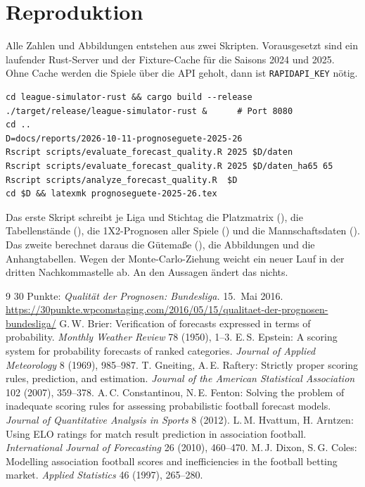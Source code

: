 \documentclass[11pt,a4paper,parskip=half,numbers=noenddot]{scrartcl}
\newcommand{\code}[1]{\texttt{#1}}
\begin{document}
\clearpage
\section{Reproduktion}\label{anh:repro}

Alle Zahlen und Abbildungen entstehen aus zwei Skripten. Vorausgesetzt sind
ein laufender Rust-Server und der Fixture-Cache 
für die Saisons 2024 und 2025. Ohne Cache werden die Spiele über die API
geholt, dann ist \code{RAPIDAPI\_KEY} nötig.
\begin{verbatim}
cd league-simulator-rust && cargo build --release
./target/release/league-simulator-rust &      # Port 8080
cd ..
D=docs/reports/2026-10-11-prognoseguete-2025-26
Rscript scripts/evaluate_forecast_quality.R 2025 $D/daten
Rscript scripts/evaluate_forecast_quality.R 2025 $D/daten_ha65 65
Rscript scripts/analyze_forecast_quality.R  $D
cd $D && latexmk prognoseguete-2025-26.tex
\end{verbatim}
Das erste Skript schreibt je Liga und Stichtag die Platzmatrix
(), die Tabellenstände (), die
1X2-Prognosen aller Spiele () und die Mannschaftsdaten
(). Das zweite berechnet daraus die Gütemaße
(), die Abbildungen und die Anhangtabellen. Wegen der
Monte-Carlo-Ziehung weicht ein neuer Lauf in der dritten Nachkommastelle
ab. An den Aussagen ändert das nichts.

\begin{thebibliography}{9}\small
{} 30 Punkte: \emph{Qualität der Prognosen: Bundesliga.}
  15.~Mai 2016.
  \url{https://30punkte.wpcomstaging.com/2016/05/15/qualitaet-der-prognosen-bundesliga/}
 G.\,W. Brier: Verification of forecasts expressed in
  terms of probability. \emph{Monthly Weather Review} 78 (1950), 1--3.
 E.\,S. Epstein: A scoring system for probability
  forecasts of ranked categories. \emph{Journal of Applied Meteorology} 8
  (1969), 985--987.
 T. Gneiting, A.\,E. Raftery: Strictly proper scoring
  rules, prediction, and estimation. \emph{Journal of the American
  Statistical Association} 102 (2007), 359--378.
 A.\,C. Constantinou, N.\,E. Fenton: Solving the
  problem of inadequate scoring rules for assessing probabilistic football
  forecast models. \emph{Journal of Quantitative Analysis in Sports} 8
  (2012).
 L.\,M. Hvattum, H. Arntzen: Using ELO ratings for
  match result prediction in association football. \emph{International
  Journal of Forecasting} 26 (2010), 460--470.
 M.\,J. Dixon, S.\,G. Coles: Modelling association
  football scores and inefficiencies in the football betting market.
  \emph{Applied Statistics} 46 (1997), 265--280.
\end{thebibliography}
\end{document}
